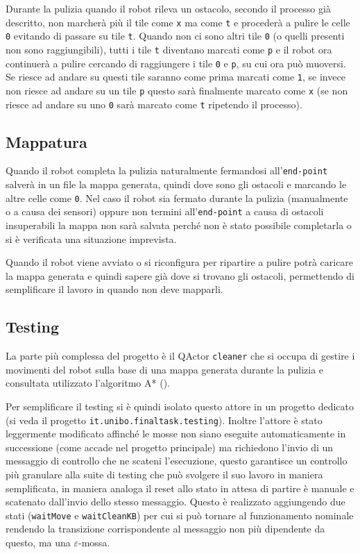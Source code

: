 Durante la pulizia quando il robot rileva un ostacolo, secondo il processo già descritto, non marcherà più il tile come \texttt{x} ma come \texttt{t} e procederà a pulire le celle \texttt{0} evitando di passare su tile \texttt{t}. Quando non ci sono altri tile \texttt{0} (o quelli presenti non sono raggiungibili), tutti i tile \texttt{t} diventano marcati come \texttt{p} e il robot ora continuerà a pulire cercando di raggiungere i tile \texttt{0} e \texttt{p}, su cui ora può muoversi. Se riesce ad andare su questi tile saranno come prima marcati come \texttt{1}, se invece non riesce ad andare su un tile \texttt{p} questo sarà finalmente marcato come \texttt{x} (se non riesce ad andare su uno \texttt{0} sarà marcato come \texttt{t} ripetendo il processo).

\subsection{Mappatura}
Quando il robot completa la pulizia naturalmente fermandosi all'\texttt{end-point} salverà in un file la mappa generata, quindi dove sono gli ostacoli e marcando le altre celle come \texttt{0}. Nel caso il robot sia fermato durante la pulizia (manualmente o a causa dei sensori) oppure non termini all'\texttt{end-point} a causa di ostacoli insuperabili la mappa non sarà salvata perché non è stato possibile completarla o si è verificata una situazione imprevista.

Quando il robot viene avviato o si riconfigura per ripartire a pulire potrà caricare la mappa generata e quindi sapere già dove si trovano gli ostacoli, permettendo di semplificare il lavoro in quando non deve mapparli.

\subsection{Testing}
La parte più complessa del progetto è il QActor \texttt{cleaner} che si occupa di gestire i movimenti del robot sulla base di una mappa generata durante la pulizia e consultata utilizzato l'algoritmo A* ().

Per semplificare il testing si è quindi isolato questo attore in un progetto dedicato (si veda il progetto \texttt{it.unibo.finaltask.testing}). Inoltre l'attore è stato leggermente modificato affinché le mosse non siano eseguite automaticamente in successione (come accade nel progetto principale) ma richiedono l'invio di un messaggio di controllo che ne scateni l'esecuzione, questo garantisce un controllo più granulare alla suite di testing che può svolgere il suo lavoro in maniera semplificata, in maniera analoga il reset allo stato in attesa di partire è manuale e scatenato dall'invio dello stesso messaggio. Questo è realizzato aggiungendo due stati (\texttt{waitMove} e \texttt{waitCleanKB}) per cui si può tornare al funzionamento nominale rendendo la transizione corrispondente al messaggio non più dipendente da questo, ma una $\varepsilon$-mossa.


